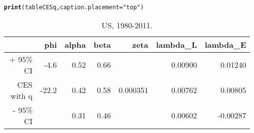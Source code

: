 \documentclass[preprint,authoryear,12pt]{elsarticle}\usepackage{graphicx, color}
\makeatletter
\newcommand{\hlfunctioncall}[1]{\textcolor[rgb]{0.501960784313725,0,0.329411764705882}{\textbf{#1}}}%
\newcommand{\hlstring}[1]{\textcolor[rgb]{0.6,0.6,1}{#1}}%
\newenvironment{kframe}{%
 \def\at@end@of@kframe{}%
 \ifinner\ifhmode%
  \def\at@end@of@kframe{\end{minipage}}%
  \begin{minipage}{\columnwidth}%
 \fi\fi%
 \def\FrameCommand##1{\hskip\@totalleftmargin \hskip-\fboxsep
 \colorbox{shadecolor}{##1}\hskip-\fboxsep
     \hskip-\linewidth \hskip-\@totalleftmargin \hskip\columnwidth}%
 \MakeFramed {\advance\hsize-\width
   \@totalleftmargin\z@ \linewidth\hsize
   \@setminipage}}%
 {\par\unskip\endMakeFramed%
 \at@end@of@kframe}
\makeatother
\begin{document}
\begin{kframe}
\begin{alltt}
\hlfunctioncall{print}(tableCESq, caption.placement=\hlstring{"top"})
\end{alltt}
\end{kframe}%
\begin{table}[ht]
\begin{center}
\caption{US, 1980-2011.}
\begin{tabular}{rrrrrrr}
  \hline
 & phi & alpha & beta & zeta & lambda\_L & lambda\_E \\ 
  \hline
+ 95\% CI & -4.6 & 0.52 & 0.66 &  & 0.00900 & 0.01240 \\ 
  CES with q & -22.2 & 0.42 & 0.58 & 0.000351 & 0.00762 & 0.00805 \\ 
  - 95\% CI &  & 0.31 & 0.46 &  & 0.00602 & -0.00287 \\ 
   \hline
\end{tabular}
\end{center}
\end{table}




\end{document}
